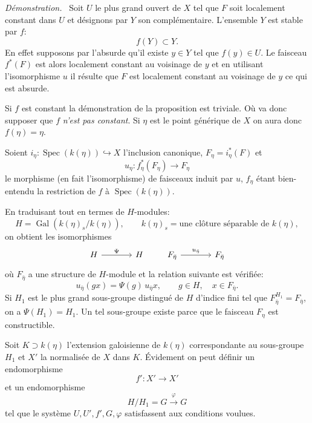 \documentclass[11pt]{article}
\newenvironment{prooftext}[1][Proof]{\par\noindent\emph{#1.}\ }{\par\medskip}
\DeclareMathOperator{\Spec}{Spec}
\providecommand{\Gal}{\operatorname{Gal}}
\providecommand{\Spec}{\operatorname{Spec}}
\providecommand{\Spec}{\operatorname{Spec}}
\providecommand{\Spec}{\operatorname{Spec}}
\providecommand{\Spec}{\operatorname{Spec}}
\providecommand{\Gal}{\operatorname{Gal}}
\begin{document}
\begin{prooftext}[Démonstration]
Soit $U$ le plus grand ouvert de $X$ tel que $F$ soit localement constant dans $U$ et désignons par $Y$ son complémentaire. L'ensemble $Y$ est stable par $f$:
\[
f(Y)\subset Y.
\]
En effet supposons par l'absurde qu'il existe $y\in Y$ tel que $f(y)\in U$. Le faisceau $f^*(F)$ est alors localement constant au voisinage de $y$ et en utilisant l'isomorphisme $u$ il résulte que $F$ est localement constant au voisinage de $y$ ce qui est absurde.

Si $f$ est constant la démonstration de la proposition est triviale. Où va donc supposer que $f$ \emph{n'est pas constant}. Si $\eta$ est le point générique de $X$ on aura donc $f(\eta)=\eta$.

Soient $i_\eta:\Spec(k(\eta))\hookrightarrow X$ l'inclusion canonique, $F_\eta=i_\eta^*(F)$ et
\[
u_\eta:f_\eta^*(F_\eta)\longrightarrow F_\eta
\]
le morphisme (en fait l'isomorphisme) de faisceaux induit par $u$, $f_\eta$ étant bien-entendu la restriction de $f$ à $\Spec(k(\eta))$.

En traduisant tout en termes de $H$-modules:
\[
H=\Gal(k(\eta)_s/k(\eta)),\qquad k(\eta)_s=\text{une clôture séparable de }k(\eta),
\]
on obtient les isomorphismes
\[
\begin{tikzcd}[column sep=large]
H \arrow[r,"\Psi"] & H
\end{tikzcd}
\qquad
\begin{tikzcd}[column sep=large]
F_{\bar\eta} \arrow[r,"u_{\bar\eta}"] & F_{\bar\eta}
\end{tikzcd}
\]
où $F_{\bar\eta}$ a une structure de $H$-module et la relation suivante est vérifiée:
\[
u_{\bar\eta}(gx)=\Psi(g)\,u_{\bar\eta} x,
\qquad g\in H,
\quad x\in F_{\bar\eta}.
\]
Si $H_1$ est le plus grand sous-groupe distingué de $H$ d'indice fini tel que $F_{\bar\eta}^{H_1}=F_{\bar\eta}$, on a $\Psi(H_1)=H_1$. Un tel sous-groupe existe parce que le faisceau $F_\eta$ est constructible.

Soit $K\supset k(\eta)$ l'extension galoisienne de $k(\eta)$ correspondante au sous-groupe $H_1$ et $X'$ la normalisée de $X$ dans $K$. Évidement on peut définir un endomorphisme
\[
f':X'\longrightarrow X'
\]
et un endomorphisme
\[
H/H_1=G\xrightarrow{\varphi}G
\]
tel que le système $U,U',f',G,\varphi$ satisfassent aux conditions voulues.
\end{prooftext}
\end{document}
